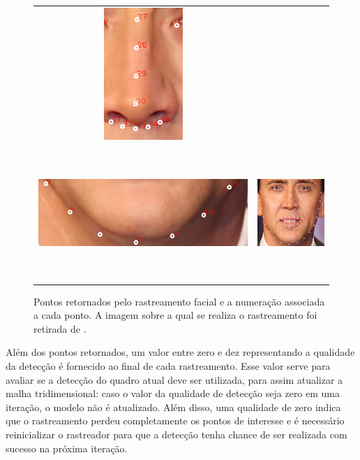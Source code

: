 \begin{figure}
\begin{tabular}{cc}
\includegraphics[width=0.4\linewidth, height=5cm]{figs/nick-marked-nose.png} \\
\includegraphics[width=0.4\linewidth, height=5cm]{figs/nick-marked-queixo.png} &
\includegraphics[width=0.4\linewidth, height=5cm]{figs/nick-marked.png}
\end{tabular}
\caption{Pontos retornados pelo rastreamento facial e a numeração associada a cada ponto. A 
imagem sobre a qual se realiza o rastreamento foi retirada de \cite{nicolas}.}
\label{fig:tracked-facial-points}
\end{figure}


Além dos pontos retornados, um valor entre zero e dez representando a qualidade
da detecção é fornecido ao final de cada rastreamento. Esse valor serve para
avaliar se a detecção do quadro atual deve ser utilizada, para assim atualizar a
malha tridimensional: caso o valor da qualidade de detecção seja zero em uma
iteração, o modelo não é atualizado. Além disso, uma qualidade de zero indica
que o rastreamento perdeu completamente os pontos de interesse e é necessário
reinicializar o rastreador para que a detecção tenha chance de ser realizada com
sucesso na próxima iteração.

